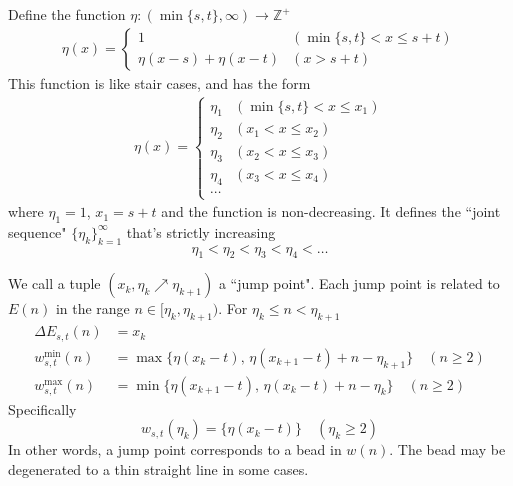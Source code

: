 \documentclass[]{article}
\begin{document}
\vspace{1cm}
\begin{lemma}[Joint]
	Define the function $\eta : (\min\{s, t\}, \infty) \to \mathbb{Z}^+$
	\begin{align*}
	\eta(x) = \begin{cases} 1  &(\min\{s, t\}<x\le s+t)\\
	 \eta(x-s) + \eta(x-t)  &(x> s+t)
	\end{cases}
	\end{align*}
	This function is like stair cases, and has the form
	\begin{align*}
	\eta(x) = \begin{cases} \eta_1  &(\min\{s, t\}<x\le x_1)\\
	\eta_2  &(x_1<x\le x_2)\\
	\eta_3  &(x_2<x\le x_3)\\
	\eta_4  &(x_3<x\le x_4)\\
	\cdots
	\end{cases}
	\end{align*}
	where $\eta_1 = 1$,  $x_1 = s+t$ and the function is non-decreasing. It defines the ``joint sequence" $\{\eta_k\}_{k=1}^{\infty}$ that's strictly increasing
	\[
	\eta_1 < \eta_2 < \eta_3 < \eta_4 < \dots
	\]
	
	We call a tuple $(x_k, \eta_k\nearrow\eta_{k+1})$ a ``jump point". Each jump point is related to $E(n)$ in the range $n \in [\eta_k, \eta_{k+1})$. For $\eta_k \le n < \eta_{k+1}$
	\begin{align*}
	\Delta E_{s,t}(n) &= x_k\\
	w^{\min}_{s,t}(n) &= \max\{\eta(x_k-t),\, \eta(x_{k+1}-t) + n -\eta_{k+1}\}\quad(n\geq 2)	\\
	w^{\max}_{s,t}(n) &= \min\{\eta(x_{k+1}-t),\,\eta(x_k-t) + n -\eta_k \} \quad(n\geq 2)
	\end{align*}
	Specifically
	\[
	w_{s,t}(\eta_k) = \{\eta(x_k-t)\}\quad(\eta_k\geq 2)
	\]
	In other words, a jump point corresponds to a bead in $w(n)$. The bead may be degenerated to a thin straight line in some cases.
\end{lemma}
\end{document}
